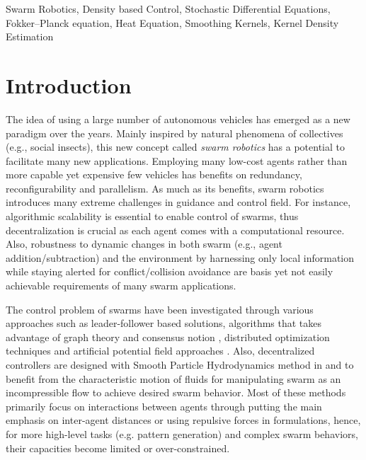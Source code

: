 \documentclass{ifacconf}
\begin{document}
\begin{frontmatter}
\begin{keyword}
Swarm Robotics, Density based Control, Stochastic Differential Equations, Fokker--Planck equation, Heat Equation, Smoothing Kernels, Kernel Density Estimation
\end{keyword}

\end{frontmatter}

\section{Introduction}

The idea of using a large number of autonomous vehicles has emerged as a new paradigm over the years. Mainly inspired by natural phenomena of collectives (e.g., social insects), this new concept called \emph{swarm robotics} has a potential to facilitate many new applications. Employing many low-cost agents rather than more capable yet expensive few vehicles has benefits on redundancy, reconfigurability and parallelism. As much as its benefits, swarm robotics introduces many extreme challenges in guidance and control field. For instance, algorithmic scalability is essential to enable control of swarms, thus decentralization is crucial as each agent comes with a computational resource. Also, robustness to dynamic changes in both swarm (e.g., agent addition/subtraction) and the environment by harnessing only local information while staying alerted for conflict/collision avoidance are basis yet not easily achievable requirements of many swarm applications. 

The control problem of swarms have been investigated through various approaches such as leader-follower \cite{desai2001modeling,yu2010distributed} based solutions, algorithms that takes advantage of graph theory and consensus notion \cite{mesbahi2010graph,chapman2015advection,galbusera2007control}, distributed optimization techniques \cite{zhu2015distributed} and artificial potential field approaches \cite{chaimowicz2005controlling}. Also, decentralized controllers are designed with Smooth Particle Hydrodynamics method \cite{monaghan2005smoothed} in \cite{pimenta2008control} and \cite{pimenta2013swarm} to benefit from the characteristic motion of fluids for manipulating swarm as an incompressible flow to achieve desired swarm behavior. Most of these methods primarily focus on interactions between agents through putting the main emphasis on inter-agent distances or using repulsive forces in formulations, hence, for more high-level tasks (e.g. pattern generation) and complex swarm behaviors, their capacities become limited or over-constrained. 
\end{document}
